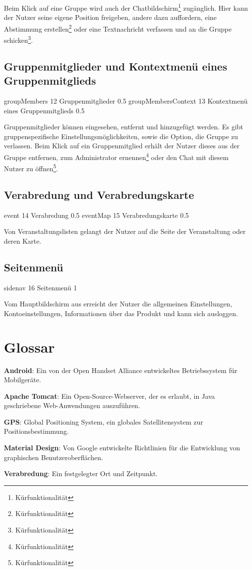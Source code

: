 \documentclass[parskip=full,11pt]{scrartcl}
\begin{document}
Beim Klick auf eine Gruppe wird auch der Chatbildschirm\footnote[1]{Kürfunktionalität} zugänglich. Hier kann der Nutzer seine eigene Position freigeben, andere dazu auffordern, eine Abstimmung erstellen\footnote[1]{Kürfunktionalität} oder eine Textnachricht verfassen und an die Gruppe schicken\footnote[1]{Kürfunktionalität}.

\subsection{Gruppenmitglieder und Kontextmenü eines Gruppenmitglieds}
{groupMembers}
{12}
{Gruppenmitglieder}
{0.5}
{groupMembersContext}
{13}
{Kontextmenü eines Gruppenmitglieds}
{0.5}

Gruppenmitglieder können eingesehen, entfernt und hinzugefügt werden. Es gibt gruppenspezifische Einstellungsmöglichkeiten, sowie die Option, die Gruppe zu verlassen.
Beim Klick auf ein Gruppenmitglied erhält der Nutzer dieses aus der Gruppe entfernen, zum Administrator ernennen\footnote[1]{Kürfunktionalität} oder den Chat mit diesem Nutzer zu öffnen\footnote[1]{Kürfunktionalität}.

\subsection{Verabredung  und Verabredungskarte}
{event}
{14}
{Verabredung}
{0.5}
{eventMap}
{15}
{Verabredungskarte}
{0.5}

Von Veranstaltungslisten gelangt der Nutzer auf die Seite der Veranstaltung oder deren Karte.

\subsection{Seitenmenü}
{sidenav}
{16}
{Seitenmenü}
{1}

Vom Hauptbildschirm aus erreicht der Nutzer die allgemeinen Einstellungen, Kontoeinstellungen, Informationen über das Produkt und kann sich ausloggen.

\section{Glossar}

\textbf{Android}:
Ein von der Open Handset Alliance entwickeltes Betriebssystem für Mobilgeräte.

\textbf{Apache Tomcat}:
Ein Open-Source-Webserver, der es erlaubt, in Java geschriebene Web-Anwendungen
auszuführen.

\textbf{GPS}:
Global Positioning System, ein globales Satellitensystem zur
Positionsbestimmung.

\textbf{Material Design}:
Von Google entwickelte Richtlinien für die Entwicklung von graphischen
Benutzeroberflächen.

\textbf{Verabredung}:
Ein festgelegter Ort und Zeitpunkt.
\end{document}
